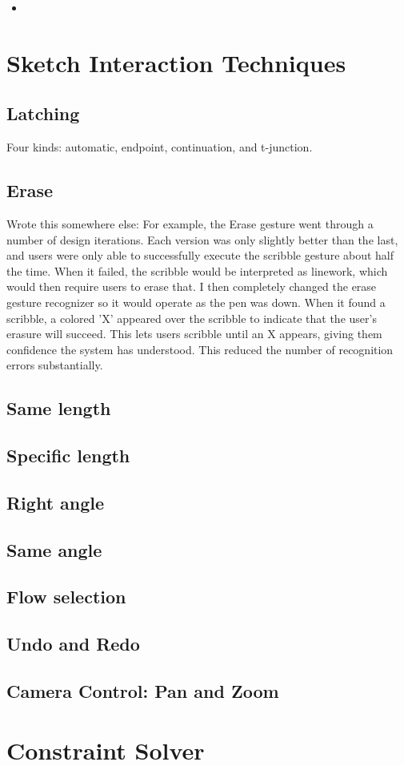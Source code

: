 \begin{itemize}
\item 
\end{itemize}

\section{Sketch Interaction Techniques}

\subsection{Latching}

Four kinds: automatic, endpoint, continuation, and t-junction.

\subsection{Erase}

Wrote this somewhere else: For example, the Erase gesture went through
a number of design iterations. Each version was only slightly better
than the last, and users were only able to successfully execute the
scribble gesture about half the time. When it failed, the scribble
would be interpreted as linework, which would then require users to
erase that. I then completely changed the erase gesture recognizer so
it would operate as the pen was down. When it found a scribble, a
colored 'X' appeared over the scribble to indicate that the user's
erasure will succeed. This lets users scribble until an X appears,
giving them confidence the system has understood. This reduced the
number of recognition errors substantially.


\subsection{Same length}

\subsection{Specific length}

\subsection{Right angle}

\subsection{Same angle}

\subsection{Flow selection}

\subsection{Undo and Redo}

\subsection{Camera Control: Pan and Zoom}


\section{Constraint Solver}
